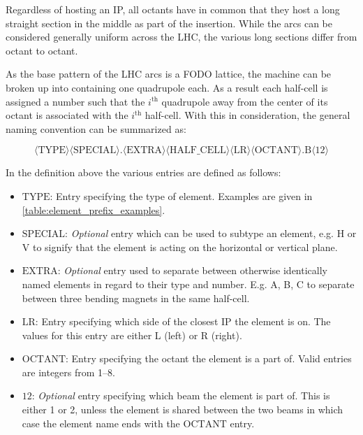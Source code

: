 Regardless of hosting an \gls{IP}, all octants have in common that they host a long straight section in the middle as part of the insertion.
While the arcs can be considered generally uniform across the \gls{LHC}, the various long sections differ from octant to octant.

As the base pattern of the \gls{LHC} arcs is a FODO lattice, the machine can be broken up into  containing one quadrupole each.
As a result each half-cell is assigned a number such that the \(i^{\mathrm{th}}\) quadrupole away from the center of its octant is associated with the \(i^{\mathrm{th}}\) half-cell.
With this in consideration, the general naming convention can be summarized as:

\begin{equation*}
    \langle \mathrm{TYPE} \rangle \langle \mathrm{SPECIAL} \rangle . \langle \mathrm{EXTRA} \rangle \langle \mathrm{HALF\_CELL} \rangle \langle \mathrm {LR} \rangle \langle \mathrm{OCTANT} \rangle . \mathrm{B} \langle \mathrm{12} \rangle
    \label{equation:lhc_naming_nomenclature}
\end{equation*}

In the definition above the various entries are defined as follows:
\begin{itemize}
    \item \(\mathrm{TYPE}\): Entry specifying the type of element. Examples are given in \cref{table:element_prefix_examples}.
    \item \(\mathrm{SPECIAL}\): \textit{Optional} entry which can be used to subtype an element, e.g. H or V to signify that the element is acting on the horizontal or vertical plane.
    \item \(\mathrm{EXTRA}\): \textit{Optional} entry used to separate between otherwise identically named elements in regard to their type and number. E.g. A, B, C to separate between three bending magnets in the same half-cell.
    \item \(\mathrm{LR}\): Entry specifying which side of the closest IP the element is on. The values for this entry are either L (left) or R (right).
    \item \(\mathrm{OCTANT}\): Entry specifying the octant the element is a part of. Valid entries are integers from \numrange{1}{8}.
    \item \(\mathrm{12}\): \textit{Optional} entry specifying which beam the element is part of. This is either \num{1} or \num{2}, unless the element is shared between the two beams in which case the element name ends with the \(\mathrm{OCTANT}\) entry.
\end{itemize}


